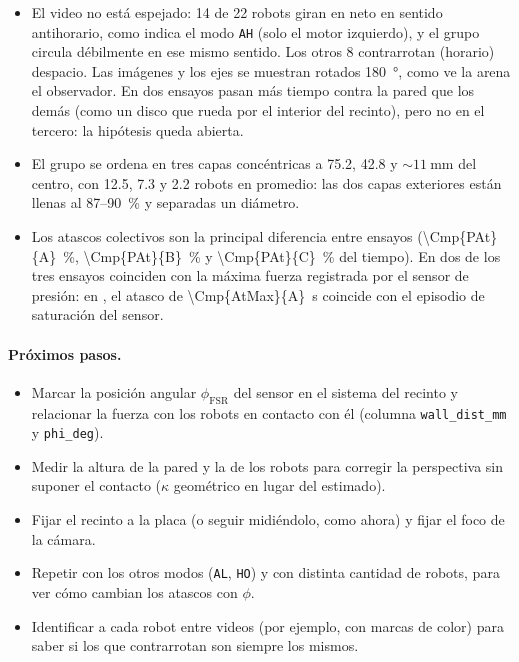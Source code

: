 \begin{itemize}
        superdifusivo ($\alpha \approx 1{,}3$) en los tres.
  \item El video no está espejado: 14 de 22 robots giran en neto en sentido antihorario, como indica el
        modo \texttt{AH} (solo el motor izquierdo), y el grupo circula débilmente en ese mismo sentido. Los
        otros 8 contrarrotan (horario) despacio. Las imágenes y los ejes se muestran rotados
        \SI{180}{\degree}, como ve la arena el observador. En dos ensayos pasan más tiempo contra la pared que los demás (como un disco
        que rueda por el interior del recinto), pero no en el tercero: la hipótesis queda abierta.
  \item El grupo se ordena en tres capas concéntricas a \SI{75.2}{}, \SI{42.8}{} y $\sim\SI{11}{\milli\metre}$
        del centro, con \num{12.5}, \num{7.3} y \num{2.2} robots en promedio: las dos capas exteriores
        están llenas al \num{87}--\SI{90}{\percent} y separadas un diámetro.
  \item Los atascos colectivos son la principal diferencia entre ensayos (\SI{\Cmp{PAt}{A}}{\percent},
        \SI{\Cmp{PAt}{B}}{\percent} y \SI{\Cmp{PAt}{C}}{\percent} del tiempo). En dos de los tres ensayos
        coinciden con la máxima fuerza registrada por el sensor de presión: en , el atasco de
        \SI{\Cmp{AtMax}{A}}{\second} coincide con el episodio de saturación del sensor.
\end{itemize}

\paragraph{Próximos pasos.}
\begin{itemize}
  \item Marcar la posición angular $\phi_{\mathrm{FSR}}$ del sensor en el sistema del recinto y relacionar
        la fuerza con los robots en contacto con él (columna \texttt{wall\_dist\_mm} y \texttt{phi\_deg}).
  \item Medir la altura de la pared y la de los robots para corregir la perspectiva sin suponer el
        contacto ($\kappa$ geométrico en lugar del estimado).
  \item Fijar el recinto a la placa (o seguir midiéndolo, como ahora) y fijar el foco de la cámara.
  \item Repetir con los otros modos (\texttt{AL}, \texttt{HO}) y con distinta cantidad de robots, para ver
        cómo cambian los atascos con $\phi$.
  \item Identificar a cada robot entre videos (por ejemplo, con marcas de color) para saber si los que
        contrarrotan son siempre los mismos.
\end{itemize}
